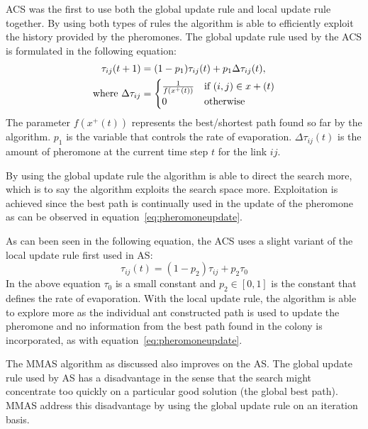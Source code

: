 ACS was the first to use both the global update rule and local update rule together\cite{CompuIntelligenceIntro}. By using both types of rules the algorithm is able to efficiently exploit the history provided by the pheromones\cite{CompuIntelligenceIntro}. The global update rule used by the ACS is formulated in the following equation\cite{CompuIntelligenceIntro}:
\begin{align}
\label{eq:pheromoneupdate}
	\tau_{ij}(t + 1) &= (1 - p_1)\tau_{ij}(t) + p_1\Delta\tau_{ij}(t),\\
	\text{where }\Delta\tau_{ij} &= \notag
	\begin{cases}
		\frac{1}{f(x^+(t))} &\text{if $(i,j) \in x+(t)$}\\
		0 &\text{otherwise}
	\end{cases}
\end{align}
The parameter $f(x^+(t))$ represents the best/shortest path found so far by the algorithm\cite{CompuIntelligenceIntro}. $p_1$ is the variable that controls the rate of evaporation. $\Delta\tau_{ij}(t)$ is the amount of pheromone at the current time step $t$ for the link $ij$.

By using the global update rule the algorithm is able to direct the search more, which is to say the algorithm exploits the search space more. Exploitation is achieved since the best path is continually used in the update of the pheromone as can be observed in equation~\ref{eq:pheromoneupdate}\cite{CompuIntelligenceIntro,FundamentalSwarm}.

As can been seen in the following equation, the ACS uses a slight variant of the local update rule first used in AS\cite{CompuIntelligenceIntro}:
\begin{equation}
	\tau_{ij}(t) = (1 - p_2)\tau_{ij} + p_2\tau_0
\end{equation}
In the above equation $\tau_0$ is a small constant and $p_2 \in [0,1]$ is the constant that defines the rate of evaporation\cite{CompuIntelligenceIntro}. With the local update rule, the algorithm is able to explore more as the individual ant constructed path is used to update the pheromone and no information from the best path found in the colony is incorporated, as with equation~\ref{eq:pheromoneupdate}\cite{CompuIntelligenceIntro,FundamentalSwarm}.

The MMAS algorithm as discussed also improves on the AS. The global update rule used by AS has a disadvantage in the sense that the search might concentrate too quickly on a particular good solution (the global best path)\cite{FundamentalSwarm}. MMAS address this disadvantage by using the global update rule on an iteration basis\cite{FundamentalSwarm}.

